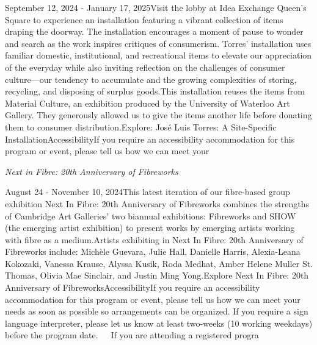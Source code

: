 \documentclass[letterpaper, 10pt]{article}
\newcommand{\subtitle}[1]{\textit{\large #1}\vspace{0.5em}}
\newcommand{\articlecontent}[1]{\small #1\vspace{1em}}
\begin{document}
\begin{multicols}{2}
{
\vspace{10px}

September 12, 2024 - January 17, 2025Visit the lobby at Idea Exchange Queen's Square to experience an installation featuring a vibrant collection of items draping the doorway. The installation encourages a moment of pause to wonder and search as the work inspires critiques of consumerism. Torres’ installation uses familiar domestic, institutional, and recreational items to elevate our appreciation of the everyday while also inviting reflection on the challenges of consumer culture—our tendency to accumulate and the growing complexities of storing, recycling, and disposing of surplus goods.This installation reuses the items from Material Culture, an exhibition produced by the University of Waterloo Art Gallery. They generously allowed us to give the items another life before donating them to consumer distribution.Explore: José Luis Torres: A Site-Specific InstallationAccessibilityIf you require an accessibility accommodation for this program or event, please tell us how we can meet your
}
\vspace{10px}

\subtitle{Next in Fibre: 20th Anniversary of Fibreworks}

\articlecontent{

\qrcode[height=1.5cm]{https://ideaexchange.libnet.info/event/11807132}
\vspace{10px}

August 24 - November 10, 2024This latest iteration of our fibre-based group exhibition Next In Fibre: 20th Anniversary of Fibreworks combines the strengths of Cambridge Art Galleries’ two biannual exhibitions: Fibreworks and SHOW (the emerging artist exhibition) to present works by emerging artists working with fibre as a medium.Artists exhibiting in Next In Fibre: 20th Anniversary of Fibreworks include: Michèle Guevara, Julie Hall, Danielle Harris, Alexia-Leana Kokozaki, Vanessa Krause, Alyssa Kusik, Roda Medhat, Amber Helene Muller St. Thomas, Olivia Mae Sinclair, and Justin Ming Yong.Explore Next In Fibre: 20th Anniversary of FibreworksAccessibilityIf you require an accessibility accommodation for this program or event, please tell us how we can meet your needs as soon as possible so arrangements can be organized. If you require a sign language interpreter, please let us know at least two-weeks (10 working weekdays) before the program date.   If you are attending a registered progra
}
\vspace{10px}


\end{multicols}
\end{document}

